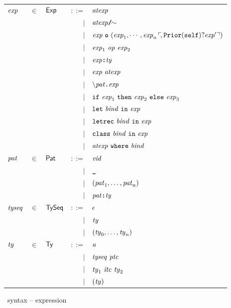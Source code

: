 \documentclass[final]{article}
\begin{document}
\begin{figure}[t]
\begin{small}
\begin{center}
\begin{tabular}{lllrl}
    $\mathit{exp}$
    & $\in$
    & $\mathsf{Exp}$
    & $::=$
    & $\mathit{atexp}$\\
    &&& $\mid$
    & $\CONSquotient{\METAatexp}$\\
    &&& $\mid$
    & $\mathit{exp}\ \textbf{\texttt{o}}\ (\mathit{exp}_1,\cdots,\mathit{exp}_n\,\ulcorner\!,\mathtt{Prior}(\mathtt{self})?\mathit{exp}'\urcorner)$\\
    &&& $\mid$
    & $\mathit{exp}_1\ \mathit{op}\ \mathit{exp}_2$\\
    &&& $\mid$
    & $\mathit{exp} \textbf{\texttt{:}} \mathit{ty}$\\
    &&& $\mid$
    & $\mathit{exp}\ \mathit{atexp}$\\
    &&& $\mid$
    & $\textbf{\texttt{$\backslash$}}\mathit{pat}\textbf{\texttt{.}}\mathit{exp}$\\
    &&& $\mid$
    & $\mathtt{if}\ \mathit{exp}_1\ \mathtt{then}\ \mathit{exp}_2\ \mathtt{else}\ \mathit{exp}_3$\\
    &&& $\mid$
    & $\mathtt{let}\ \mathit{bind}\ \mathtt{in}\ \mathit{exp}$\\
    &&& $\mid$
    & $\mathtt{letrec}\ \mathit{bind}\ \mathtt{in}\ \mathit{exp}$\\
    &&& $\mid$
    & $\mathtt{class}\ \mathit{bind}\ \mathtt{in}\ \mathit{exp}$\\
    &&& $\mid$
    & $\mathit{atexp}\ \mathtt{where}\ \mathit{bind}$
    \\


    $\mathit{pat}$
    & $\in$
    & $\mathsf{Pat}$
    & $::=$
    & $\mathit{vid}$\\
    &&& $\mid$
    & $\textbf{\texttt{\_}}$\\
    &&& $\mid$
    & $(\mathit{pat}_1,\dots,\mathit{pat}_n)$\\
    &&& $\mid$
    & $\mathit{pat} \textbf{\texttt{:}} \mathit{ty}$
    \\

    $\mathit{tyseq}$
    & $\in$
    & $\mathsf{TySeq}$
    & $::=$
    & $\epsilon$\\
    &&& $\mid$
    & $\mathit{ty}$\\
    &&& $\mid$
    & $(\mathit{ty}_0,\dots,\mathit{ty}_n)$
    \\

    $\mathit{ty}$
    & $\in$
    & $\mathsf{Ty}$
    & $::=$
    & $\mathit{a}$\\
    &&& $\mid$
    & $\mathit{tyseq}\ \mathit{ptc}$\\
    &&& $\mid$
    & $\mathit{ty}_1\ \mathit{itc}\ \mathit{ty}_2$\\\
    &&& $\mid$
    & $(\mathit{ty})$
  \end{tabular}
\end{center}
\caption{\eml\ syntax -- expression}
\label{fig:emlsyntax1}
\end{small}
\end{figure}
\end{document}
